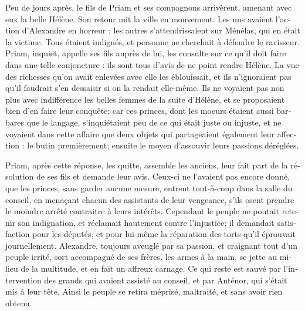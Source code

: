 \documentclass{article}
\begin{document}
\begin{pages}
\begin{Leftside}
\begin{french}
Peu de jours après, le fils de Priam et ses compagnons arrivèrent, amenant avec eux la belle Hélène. Son retour mit la ville en mouvement. Les uns avaient l'action d'Alexandre en horreur ; les autres s'attendrissaient sur Ménélas, qui en était la victime. Tous étaient indignés, et personne ne cherchait à défendre le ravisseur. Priam, inquiet, appelle ses fils auprès de lui, les consulte sur ce qu'il doit faire dans une telle conjoncture : ils sont tous d'avis de ne point rendre Hélène. La vue des richesses qu'on avait enlevées avec elle les éblouissait, et ils n'ignoraient pas qu'il faudrait s'en dessaisir si on la rendait elle-même. Ils ne voyaient pas non plus avec indifférence les belles femmes de la suite d'Hélène, et se proposaient bien d'en faire leur conquête; car ces princes, dont les moeurs étaient aussi barbares que le langage, s'inquiétaient peu de ce qui était juste ou injuste, et ne voyaient dans cette affaire que deux objets qui partageaient également leur affection : le butin premièrement; ensuite le moyen d'assouvir leurs passions déréglées,

Priam, après cette réponse, les quitte, assemble les anciens, leur fait part de la résolution de ses fils et demande leur avis. Ceux-ci ne l'avaient pas encore donné, que les princes, sans garder aucune mesure, entrent tout-à-coup dans la salle du conseil, en menaçant chacun des assistants de leur vengeance, s'ils osent prendre le moindre arrêté contraitre à leurs intérêts. Cependant le peuple ne poutait retenir son indignation, et réclamait hautement contre l'injustice; il demandait satisfaction pour les députés, et pour lui-même la réparation des torts qu'il éprouvait journellement. Alexandre, toujours aveuglé par sa passion, et craignant tout d'un peuple irrité, sort accompagné de ses frères, les armes à la main, se jette au milieu de la multitude, et en fait un affreux carnage. Ce qui reste est sauvé par l'intervention des grands qui avaient assisté au conseil, et par Anténor, qui s'était mis â leur tête. Ainsi le peuple se retira méprisé, maltraité, et sans avoir rien obtenu.


\end{french}
\end{Leftside}
\end{pages}
\end{document}

